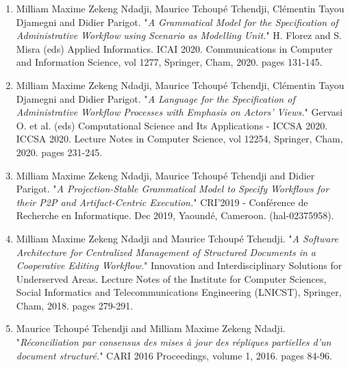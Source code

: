 \begin{enumerate}
	\item Milliam Maxime Zekeng Ndadji, Maurice Tchoup{\'e} Tchendji, Cl{\'e}mentin Tayou Djamegni and Didier Parigot. "\textit{A Grammatical Model for the Specification of Administrative Workflow using Scenario as Modelling Unit.}" H. Florez and S. Misra (eds) Applied Informatics. ICAI 2020. Communications in Computer and Information Science, vol 1277, Springer, Cham, 2020. pages 131-145.
	\item Milliam Maxime Zekeng Ndadji, Maurice Tchoup{\'e} Tchendji, Cl{\'e}mentin Tayou Djamegni and Didier Parigot. "\textit{A Language for the Specification of Administrative Workflow Processes with Emphasis on Actors' Views.}" Gervasi O. et al. (eds) Computational Science and Its Applications - ICCSA 2020. ICCSA 2020. Lecture Notes in Computer Science, vol 12254, Springer, Cham, 2020. pages 231-245.
	\item Milliam Maxime Zekeng Ndadji, Maurice Tchoup{\'e} Tchendji and Didier Parigot. "\textit{A Projection-Stable Grammatical Model to Specify Workflows for their P2P and Artifact-Centric Execution.}" CRI'2019 - Conf{\'e}rence de Recherche en Informatique. Dec 2019, Yaound{\'e}, Cameroon. (hal-02375958).
	\item Milliam Maxime Zekeng Ndadji and Maurice Tchoup{\'e} Tchendji. "\textit{A Software Architecture for Centralized Management of Structured Documents in a Cooperative Editing Workflow.}" Innovation and Interdisciplinary Solutions for Underserved Areas. Lecture Notes of the Institute for Computer Sciences, Social Informatics and Telecommunications Engineering (LNICST), Springer, Cham, 2018. pages 279-291.
	\item Maurice Tchoup{\'e} Tchendji and Milliam Maxime Zekeng Ndadji. "\textit{R{\'e}conciliation par consensus des mises {\`a} jour des r{\'e}pliques partielles d'un document structur{\'e}.}" CARI 2016 Proceedings, volume 1, 2016. pages 84-96.
\end{enumerate}


\myRestoreMarks

